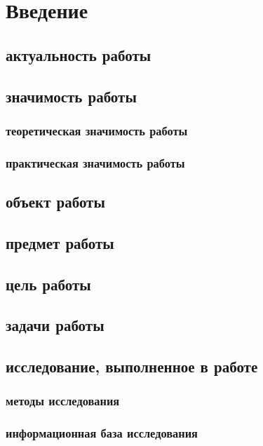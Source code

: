 \chapter{Введение}

\section{актуальность работы}
\section{значимость работы}
\subsection{теоретическая значимость работы}
\subsection{практическая значимость работы}
\section{объект работы}
\section{предмет работы}
\section{цель работы}
\section{задачи работы}
\section{исследование, выполненное в работе}
\subsection{методы исследования}
\subsection{информационная база исследования} 

